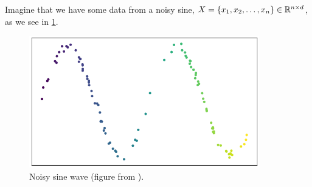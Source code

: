 Imagine that we have some data from a noisy sine, $X = \left\{x_1, x_2, \ldots, x_n\right\} \in \mathbb{R}^{n \times d}$, as we see in \cref{fig:how_umap_works_raw_data}.
\begin{figure}[H]
    \centering
    \includegraphics[width=10cm]{thesis/figures/how_umap_works_raw_data.png}
    \caption{Noisy sine wave (figure from \cite{how-umap-works-2018}).}
    \label{fig:how_umap_works_raw_data}
\end{figure}

